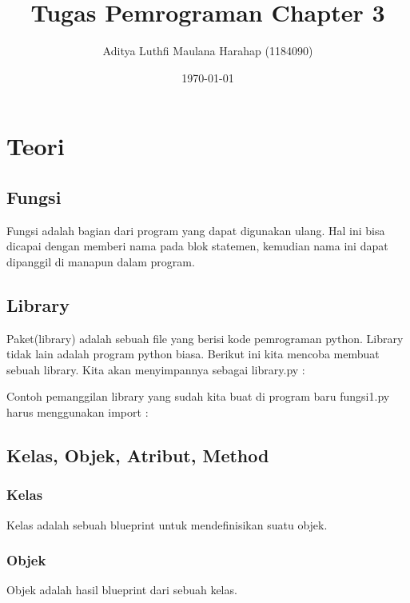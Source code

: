 \documentclass[12pt, times new roman]{report}
\title{Tugas Pemrograman Chapter 3}
\author{Aditya Luthfi Maulana Harahap (1184090)}
\date{\today}
\begin{document}
\maketitle

\chapter{Teori}

\section{Fungsi}
\hspace{1cm} Fungsi adalah bagian dari program yang dapat digunakan ulang. Hal ini bisa dicapai dengan memberi nama pada blok statemen, kemudian nama ini dapat dipanggil di manapun dalam program.



\section{Library}
\hspace{1cm} Paket(library) adalah sebuah file yang berisi kode pemrograman python. Library tidak lain adalah program python biasa. Berikut ini kita mencoba membuat sebuah library. Kita akan menyimpannya sebagai library.py :



\hspace{0.5cm} Contoh pemanggilan library yang sudah kita buat di program baru fungsi1.py harus menggunakan import :




\section{Kelas, Objek, Atribut, Method}

\subsection{Kelas}
\hspace{1cm} Kelas adalah sebuah blueprint untuk mendefinisikan suatu objek.


\subsection{Objek}
\hspace{1cm} Objek adalah hasil blueprint dari sebuah kelas.

\end{document}
